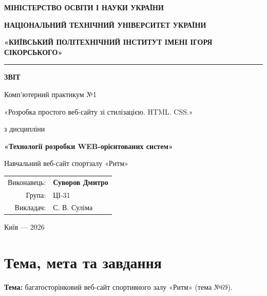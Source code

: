\documentclass[12pt,a4paper]{article}
\newcommand{\AuthorName}{Суворов Дмитро}
\newcommand{\StudentGroup}{ЦІ-31}
\begin{document}
\begin{titlepage}
\thispagestyle{empty}
\begin{center}
{\small\sffamily\bfseries МІНІСТЕРСТВО ОСВІТИ І НАУКИ УКРАЇНИ}\par\vspace{5mm}
{\small\sffamily\bfseries НАЦІОНАЛЬНИЙ ТЕХНІЧНИЙ УНІВЕРСИТЕТ УКРАЇНИ}\par
{\small\sffamily\bfseries «КИЇВСЬКИЙ ПОЛІТЕХНІЧНИЙ ІНСТИТУТ ІМЕНІ ІГОРЯ СІКОРСЬКОГО»}\par
\vspace{25mm}
{\color{sage}\rule{38mm}{1.8pt}}\par\vspace{8mm}
{\LARGE\sffamily\bfseries\color{forest} ЗВІТ}\par\vspace{5mm}
{\Large\sffamily Комп'ютерний практикум №1}\par\vspace{3mm}
{\large «Розробка простого веб-сайту зі стилізацією. HTML. CSS.»}\par\vspace{11mm}
{\large з дисципліни}\par\vspace{1mm}
{\large\bfseries «Технології розробки WEB-орієнтованих систем»}\par\vspace{12mm}
\begin{tcolorbox}[width=0.87\textwidth,colback=mist,colframe=rulegray,arc=2mm,boxrule=0.7pt]
\par\smallskip
{\normalsize Навчальний веб-сайт спортзалу «Ритм»}
\end{tcolorbox}
\vfill
\begin{flushright}
\begin{tabular}{@{}rl@{}}
Виконавець: & \textbf{\AuthorName}\\
Група: & \StudentGroup\\
Викладач: & С. В. Суліма\\
\end{tabular}
\end{flushright}
\vfill
{\large Київ --- 2026}
\end{center}
\end{titlepage}

\tableofcontents
\clearpage

\section{Тема, мета та завдання}
\textbf{Тема:} багатосторінковий веб-сайт спортивного залу «Ритм» (тема №69).
\end{document}
